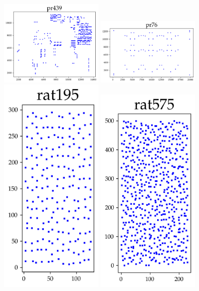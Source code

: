 \begin{appendices}
\begin{figure}[H]
\end{figure}

\begin{figure}[H]
\centering
\includegraphics[width=5cm]{../tsplib_euc2d_pictures_of_instances/pr439.png}
\includegraphics[width=5cm]{../tsplib_euc2d_pictures_of_instances/pr76.png}
\includegraphics[width=5cm]{../tsplib_euc2d_pictures_of_instances/rat195.png}
\includegraphics[width=5cm]{../tsplib_euc2d_pictures_of_instances/rat575.png}

\end{figure}
\end{appendices}
